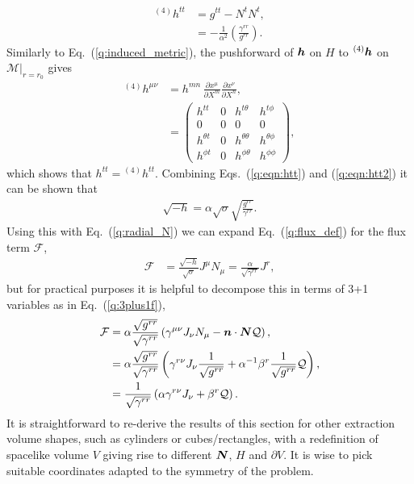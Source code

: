 \begin{align}
{}^{(4)}h^{tt} &=      g^{tt} - N^t N^t, \\
\label{q:eqn:htt2}&= -\frac{1}{\alpha^2}\left(\frac{\gamma^{rr}}{g^{rr}} \right).
\end{align}
Similarly to Eq.~(\ref{q:induced_metric}), the pushforward of $\boldsymbol h$ on $H$ to ${}^{(4)}\boldsymbol h$ on $\mathcal{M}\vert_{r=r_0}$ gives
\begin{align}
{}^{(4)} h^{\mu\nu}  &= h^{mn}\,\frac{\partial x^\mu}{\partial X^m} \frac{\partial x^\nu}{\partial X^n}, \\
 &= \begin{pmatrix} h^{tt}&0&h^{t\theta }&h^{t\phi} \\ 0&0&0&0 \\ h^{\theta t}&0&h^{\theta \theta }&h^{\theta \phi} \\ h^{\phi t}&0&h^{\phi\theta }&h^{\phi\phi} \end{pmatrix},
\end{align}
which shows that $h^{tt}={}^{(4)}h^{tt}$. Combining Eqs.~(\ref{q:eqn:htt}) and (\ref{q:eqn:htt2}) it can be shown that
\begin{align}
     \label{q:rootminushexpand}\sqrt{-h} = \alpha \sqrt{\sigma} \sqrt{\frac{g^{rr}}{\gamma^{rr}}}.
\end{align}
Using this with Eq.~(\ref{q:radial_N}) we can expand Eq.~(\ref{q:flux_def}) for the flux term $\mathcal{F}$, 
\begin{align}
 \label{q:spherical_flux}\mathcal{F}&=  \frac{\sqrt{-h}}{\sqrt{\sigma}} J^\mu N_\mu = \frac{\alpha}{\sqrt{\gamma^{rr}}} J^r, 
 \end{align}
 but for practical purposes it is helpful to decompose this in terms of 3+1 variables as in Eq.~(\ref{q:3plus1f}),
 \begin{align}
   \mathcal{F} &= \alpha\frac{\sqrt{g^{rr}}}{\sqrt{\gamma^{rr}}} \left(\gamma^{\mu\nu}J_\nu {N}_\mu - \boldsymbol{n} \cdot \boldsymbol{N} \mathcal{Q}\right), \\
                   &=  \alpha\frac{\sqrt{g^{rr}}}{\sqrt{\gamma^{rr}}}\left(\gamma^{r\nu}J_\nu \frac{1}{\sqrt{g^{rr}}} +\alpha^{-1}\beta^r\frac{1}{\sqrt{g^{rr}}} \mathcal{Q}\right), \\
\label{q:3plus1fluxspherical}   &= \frac{1}{\sqrt{\gamma^{rr}}}\left(\alpha\gamma^{r\nu}J_\nu  + \beta^r \mathcal{Q}\right).
\end{align}
It is straightforward to re-derive the results of this section for other extraction volume shapes, such as cylinders or cubes/rectangles, with a redefinition of spacelike volume $V$ giving rise to different $\boldsymbol{N}$, $H$ and $\partial V$. It is wise to pick suitable coordinates adapted to the symmetry of the problem.











